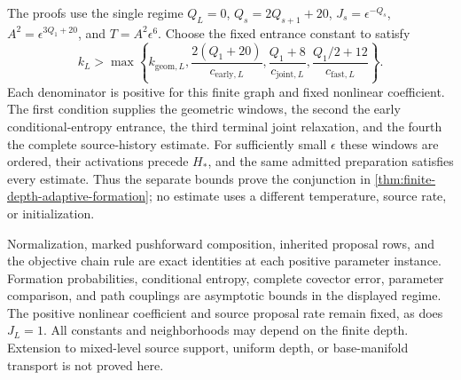 The proofs use the single regime
$Q_L=0$, $Q_s=2Q_{s+1}+20$, $J_s=\epsilon^{-Q_s}$,
$A^2=\epsilon^{3Q_1+20}$, and $T=A^2\epsilon^6$.
Choose the fixed entrance constant to satisfy
\begin{equation}
 k_L>
 \max\left\{
 k_{\mathrm{geom},L},
 \frac{2(Q_1+20)}{c_{\mathrm{early},L}},
 \frac{Q_1+8}{c_{\mathrm{joint},L}},
 \frac{Q_1/2+12}{c_{\mathrm{fast},L}}
 \right\}.
 \label{eq:rg-formation-joined-entrance-proof}
\end{equation}
Each denominator is positive for this finite graph and fixed
nonlinear coefficient. The first condition supplies the geometric
windows, the second the early conditional-entropy entrance, the
third terminal joint relaxation, and the fourth the complete
source-history estimate. For sufficiently small $\epsilon$ these
windows are ordered, their activations precede $H_*$, and the same
admitted preparation satisfies every estimate. Thus the separate
bounds prove the conjunction in
\cref{thm:finite-depth-adaptive-formation}; no estimate uses a
different temperature, source rate, or initialization.

Normalization, marked pushforward composition, inherited proposal
rows, and the objective chain rule are exact identities at each
positive parameter instance. Formation probabilities, conditional
entropy, complete covector error, parameter comparison, and path
couplings are asymptotic bounds in the displayed regime. The
positive nonlinear coefficient and source proposal rate remain
fixed, as does $J_L=1$. All constants and neighborhoods may depend
on the finite depth. Extension to mixed-level source support,
uniform depth, or base-manifold transport is not proved here.
